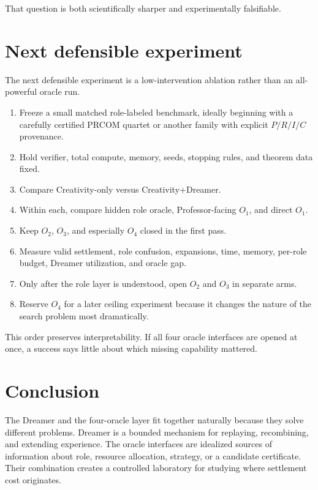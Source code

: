 \documentclass[11pt]{article}
\begin{document}
That question is both scientifically sharper and experimentally falsifiable.

\section{Next defensible experiment}

The next defensible experiment is a low-intervention ablation rather than an all-powerful oracle run.

\begin{enumerate}[leftmargin=2em]
\item Freeze a small matched role-labeled benchmark, ideally beginning with a carefully certified PRCOM quartet or another family with explicit $P/R/I/C$ provenance.
\item Hold verifier, total compute, memory, seeds, stopping rules, and theorem data fixed.
\item Compare Creativity-only versus Creativity+Dreamer.
\item Within each, compare hidden role oracle, Professor-facing $O_1$, and direct $O_1$.
\item Keep $O_2$, $O_3$, and especially $O_4$ closed in the first pass.
\item Measure valid settlement, role confusion, expansions, time, memory, per-role budget, Dreamer utilization, and oracle gap.
\item Only after the role layer is understood, open $O_2$ and $O_3$ in separate arms.
\item Reserve $O_4$ for a later ceiling experiment because it changes the nature of the search problem most dramatically.
\end{enumerate}

This order preserves interpretability. If all four oracle interfaces are opened at once, a success says little about which missing capability mattered.

\section{Conclusion}

The Dreamer and the four-oracle layer fit together naturally because they solve different problems. Dreamer is a bounded mechanism for replaying, recombining, and extending experience. The oracle interfaces are idealized sources of information about role, resource allocation, strategy, or a candidate certificate. Their combination creates a controlled laboratory for studying where settlement cost originates.
\end{document}
